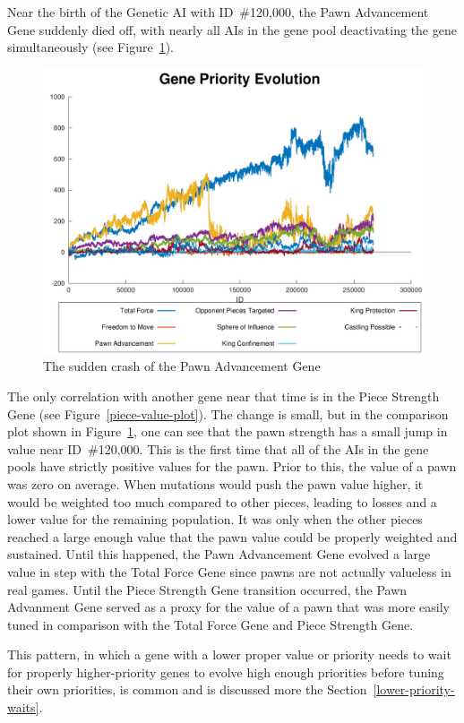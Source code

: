 \documentclass[letterpaper]{article}
\renewcommand\_{\textunderscore\allowbreak}
\begin{document}
Near the birth of the Genetic AI with ID~\#120,000, the Pawn Advancement Gene suddenly died off, with nearly all AIs in the gene pool deactivating the gene simultaneously (see Figure~\ref{pawn-crash}).
\begin{figure}[htb]
	\centering
	\includegraphics[width=\textwidth]{pawn-advancement-crash}
	\caption{The sudden crash of the Pawn Advancement Gene}
	\label{pawn-crash}
\end{figure}

The only correlation with another gene near that time is in the Piece Strength Gene (see Figure~\ref{piece-value-plot}). The change is small, but in the comparison plot shown in Figure~\ref{pawn-crash}, one can see that the pawn strength has a small jump in value near ID~\#120,000. This is the first time that all of the AIs in the gene pools have strictly positive values for the pawn. Prior to this, the value of a pawn was zero on average. When mutations would push the pawn value higher, it would be weighted too much compared to other pieces, leading to losses and a lower value for the remaining population. It was only when the other pieces reached a large enough value that the pawn value could be properly weighted and sustained. Until this happened, the Pawn Advancement Gene evolved a large value in step with the Total Force Gene since pawns are not actually valueless in real games. Until the Piece Strength Gene transition occurred, the Pawn Advanment Gene served as a proxy for the value of a pawn that was more easily tuned in comparison with the Total Force Gene and Piece Strength Gene. 

This pattern, in which a gene with a lower proper value or priority needs to wait for properly higher-priority genes to evolve high enough priorities before tuning their own priorities, is common and is discussed more the Section~\ref{lower-priority-waits}.
\end{document}

